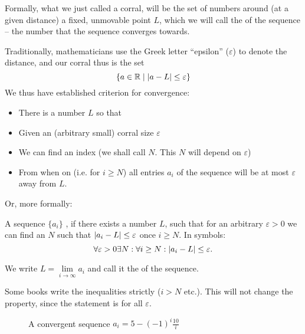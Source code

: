 Formally, what we just called a corral, will be the set of numbers around (at a given
distance) a fixed,
unmovable point $L$, which we will call the  of the sequence -- the number
that the sequence converges towards.

Traditionally, mathematicians use the Greek letter ``epsilon'' ($\varepsilon$)
to denote the distance,
and our corral thus is the set
\[
\{a\in{\mathbb R}\mid \left|a-L\right|\le\varepsilon\}
\]
We thus have established criterion for convergence:
\begin{itemize}
\item There is a number $L$ so that
\item Given an (arbitrary small) corral size $\varepsilon$
\item We can find an index (we shall call $N$. This $N$ will depend on $\varepsilon$)
\item From when on (i.e. for $i\ge N$) all entries $a_i$ of the sequence will be
at most $\varepsilon$ away from $L$.
\end{itemize}
Or, more formally:
\begin{defn}
A sequence $\{a_i\}$ , if there exists a number $L$,
such that for an arbitrary $\varepsilon>0$ we can find
an $N$ such that $\left|a_i-L\right|\le\varepsilon$ once $i\ge N$. In symbols:
\[
\forall\varepsilon>0\exists N:\forall i\ge N: \left|a_i-L\right|\le\varepsilon.
\]

We write $L=\lim\limits_{i\to\infty} a_i$ and call it the
 of the sequence.
\end{defn}
\begin{note}
Some books write the inequalities strictly ($i>N$ etc.). This will not
change the property, since the statement is for all $\varepsilon$.
\end{note}

\begin{figure}[t]
\begin{center}
\end{center}
\caption{A convergent sequence $a_i=5-(-1)^i\frac{10}{i}$}
\label{figlimitcorral}
\end{figure}

